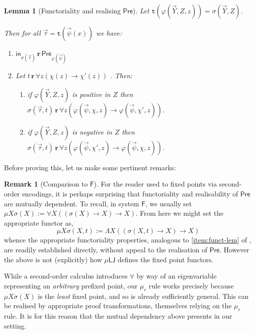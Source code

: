\documentclass[10pt,a4paper]{amsart}
\theoremstyle{plain}
\newtheorem{lemma}[lemma]{Lemma}
\theoremstyle{definition}
\newtheorem{remark}[remark]{Remark}
\renewcommand{\phi}{\varphi}
\newcommand{\dfn}{:=}
\newcommand{\red}[1]{{\color{red}#1}}
\newcommand{\todonew}[1]{{\red{TodoNew: #1}}}
\renewcommand{\todonew}[1]{}
\theoremstyle{plain}
\theoremstyle{definition} %
\newcommand{\inj}{\mathsf{in}}
\newcommand{\injX}[1]{\inj_{#1}}
\newcommand{\rr}[1]{#1_r}
\newcommand{\LJ}{\mathsf{LJ}}
\newcommand{\F}{\mathsf{F}}
\newcommand{\muLJ}{\mu\LJ}
\newcommand{\limp}{\to}
\newcommand{\preaxiom}{\mathsf{Pre}}
\newcommand{\realises}{\mathbf{r}}
\newcommand{\type}[1]{\mathtt t (#1)}
\begin{document}
\begin{lemma}
    [Functoriality and realising $\preaxiom$]
    \label{lem:funct-and-pre-realisation}
    Let $\type{\phi(\vec Y,Z,z)} = \sigma(\vec Y,Z)$.
    \todonew{G: Write simply $\mu\phi(\vec Y)$ for $\mu Z\lambda z \phi(\vec Y,Z,z)$}
    Then for all $\vec \tau = \type{\vec \psi(x)}$ we have:
    \begin{enumerate}
        \item\label{item:in-realises-pre} $\injX{\sigma(\vec \tau)} \, \realises\, \preaxiom_{\phi(\vec \psi)} $
        \item\label{item:funct-lem} Let $t \, \realises\, \forall z (\chi(z) \limp \chi'(z))$ \todonew{G: with $\type{\chi(z)} = \gamma$ and $\type{\chi'(z)} = \gamma'$}. Then:
        \todonew{G: THE RED TEXT CAN BE MOVED IN THE PROOF}
        \begin{enumerate}
            \item\label{item:funct-lem-pos} if $\phi(\vec Y,Z,z)$ is positive in $Z$ then $\sigma(\vec \tau,t)\, \realises\, \forall z (\phi(\vec \psi,\chi,z) \limp \phi (\vec\psi , \chi',z))$.
            \item\label{item:funct-lem-neg}
            if $\phi(\vec Y,Z,z)$ is negative in $Z$ then $\sigma(\vec \tau,t)\, \realises\, \forall z (\phi(\vec \psi,\chi',z) \limp \phi (\vec\psi , \chi,z))$.
        \end{enumerate}
    \end{enumerate}
\end{lemma}

Before proving this, let us make some pertinent remarks:
\begin{remark}
    [Comparison to $\F$]
    For the reader used to fixed points via second-order encodings, it is perhaps surprising that functoriality and realisability of $\preaxiom$ are mutually dependent. 
    To recall, in system $\F$, we usually set $\mu X\sigma(X) \dfn \forall X ((\sigma(X) \to X) \to X)$. 
    From here we might set the appropriate functor as,
    \[
        \mu X \sigma(X,t) \dfn \Lambda X ((\sigma(X,t)\to X)\to X)
    \]
    whence the appropriate functoriality properties, analogous to \eqref{item:funct-lem} of , are readily established directly, without appeal to the realisation of $\preaxiom$.
    However the above is not (explicitly) how $\muLJ$ defines the fixed point functors.
    
    While a second-order calculus introduces $\forall$ by way of an eigenvariable representing an \emph{arbitrary} prefixed point, our $\rr\mu$ rule works precisely because $\mu X\sigma(X)$ is the \emph{least} fixed point, and so is already sufficiently general.
    This can be realised by appropriate proof transformations, themselves relying on the $\rr\mu$ rule.
    It is for this reason that the mutual dependency above presents in our setting.
\end{remark}
\end{document}
